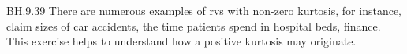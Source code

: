 
\setcounter{theorem}{38}
\begin{exercise} BH.9.39
 There are numerous examples of rvs with  non-zero kurtosis, for instance,  claim sizes of car accidents, the time patients spend in hospital beds, finance. This exercise helps to understand how a positive kurtosis may originate.
\end{exercise}

